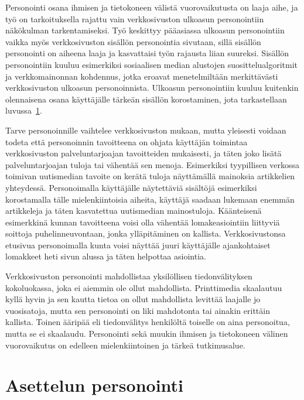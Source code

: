 \documentclass[finnish, 12pt, a4paper, elec, utf8, a-1b, online]{aaltothesis}
\begin{document}
Personointi osana ihmisen ja tietokoneen välistä vuorovaikutusta on laaja aihe,
ja työ on tarkoituksella rajattu vain verkkosivuston ulkoasun personointiin
näkökulman tarkentamiseksi. Työ keskittyy pääasiassa ulkoasun personointiin
vaikka myös verkkosivuston sisällön personointia sivutaan, sillä sisällön
personointi on aiheena laaja ja kasvattaisi työn rajausta liian suureksi.
Sisällön personointiin kuuluu esimerkiksi sosiaalisen median alustojen
suosittelualgoritmit ja verkkomainonnan kohdennus, jotka eroavat menetelmiltään
merkittävästi verkkosivuston ulkoasun personoinnista. Ulkoasun personointiin
kuuluu kuitenkin olennaisena osana käyttäjälle tärkeän sisällön korostaminen,
jota tarkastellaan luvussa~\ref{layout-personalization}.

Tarve personoinnille vaihtelee verkkosivuston mukaan, mutta yleisesti voidaan
todeta että personoinnin tavoitteena on ohjata käyttäjän toimintaa
verkkosivuston palveluntarjoajan tavoitteiden mukaisesti, ja täten joko lisätä
palveluntarjoajan tuloja tai vähentää sen menoja. Esimerkiksi tyypillisen
verkossa toimivan uutismedian tavoite on kerätä tuloja näyttämällä mainoksia
artikkelien yhteydessä. Personoimalla käyttäjälle näytettäviä sisältöjä
esimerkiksi korostamalla tälle mielenkiintoisia aiheita, käyttäjä saadaan
lukemaan enemmän artikkeleja ja täten kasvatettua uutismedian mainostuloja.
Käänteisenä esimerkkinä kunnan tavoitteena voisi olla vähentää lomakeasiointiin
liittyviä soittoja puhelinneuvontaan, jonka ylläpitäminen on kallista.
Verkkosivustonsa etusivua personoimalla kunta voisi näyttää juuri käyttäjälle
ajankohtaiset lomakkeet heti sivun alussa ja täten helpottaa asiointia.

Verkkosivuston personointi mahdollistaa yksilöllisen tiedonvälityksen
kokoluokassa, joka ei aiemmin ole ollut mahdollista. Printtimedia skaalautuu
kyllä hyvin ja sen kautta tietoa on ollut mahdollista levittää laajalle jo
vuosisatoja, mutta sen personointi on liki mahdotonta tai ainakin erittäin
kallista. Toinen ääripää eli tiedonvälitys henkilöltä toiselle on aina
personoitua, mutta se ei skaalaudu. Personointi sekä muukin ihmisen ja
tietokoneen välinen vuorovaikutus on edelleen mielenkiintoinen ja tärkeä
tutkimusalue.

\clearpage

\section{Asettelun personointi}\label{layout-personalization}
\end{document}
